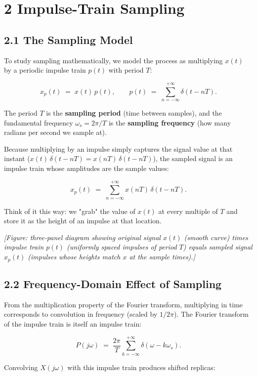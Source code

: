 \documentclass[11pt]{article}
\begin{document}
\section*{2 Impulse-Train Sampling}

\subsection*{2.1 The Sampling Model}

To study sampling mathematically, we model the process as multiplying $x(t)$ by a periodic impulse train $p(t)$ with period $T$:

\[x_p(t) \;=\; x(t)\,p(t), \qquad p(t) \;=\; \sum_{n=-\infty}^{+\infty} \delta(t-nT). \tag{1}\]

The period $T$ is the \textbf{sampling period} (time between samples), and the fundamental frequency $\omega_s = 2\pi/T$ is the \textbf{sampling frequency} (how many radians per second we sample at).

Because multiplying by an impulse simply captures the signal value at that instant ($x(t)\,\delta(t-nT) = x(nT)\,\delta(t-nT)$), the sampled signal is an impulse train whose amplitudes are the sample values:

\[x_p(t) \;=\; \sum_{n=-\infty}^{+\infty} x(nT)\,\delta(t-nT). \tag{2}\]

Think of it this way: we "grab" the value of $x(t)$ at every multiple of $T$ and store it as the height of an impulse at that location.

\textit{[Figure: three-panel diagram showing original signal $x(t)$ (smooth curve) times impulse train $p(t)$ (uniformly spaced impulses of period $T$) equals sampled signal $x_p(t)$ (impulses whose heights match $x$ at the sample times).]}

\subsection*{2.2 Frequency-Domain Effect of Sampling}

From the multiplication property of the Fourier transform, multiplying in time corresponds to convolution in frequency (scaled by $1/2\pi$). The Fourier transform of the impulse train is itself an impulse train:

\[P(j\omega) \;=\; \frac{2\pi}{T}\sum_{k=-\infty}^{+\infty}\delta(\omega-k\omega_s). \tag{3}\]

Convolving $X(j\omega)$ with this impulse train produces shifted replicas:
\end{document}
